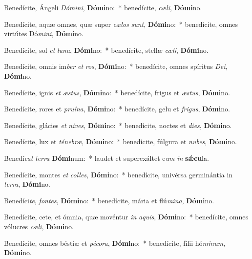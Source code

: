 \item Benedícite, Ángeli \textit{Dó}\textit{mi}\textit{ni}, \textbf{Dó}\textbf{mi}no:~* benedícite, \textit{cæ}\textit{li}, \textbf{Dó}\textbf{mi}no.
\item Benedícite, aquæ omnes, quæ super \textit{cæ}\textit{los} \textit{sunt}, \textbf{Dó}\textbf{mi}no:~* benedícite, omnes virtútes Dó\textit{mi}\textit{ni}, \textbf{Dó}\textbf{mi}no.
\item Benedícite, sol \textit{et} \textit{lu}\textit{na}, \textbf{Dó}\textbf{mi}no:~* benedícite, stellæ \textit{cæ}\textit{li}, \textbf{Dó}\textbf{mi}no.
\item Benedícite, omnis im\textit{ber} \textit{et} \textit{ros}, \textbf{Dó}\textbf{mi}no:~* benedícite, omnes spíritus \textit{De}\textit{i}, \textbf{Dó}\textbf{mi}no.
\item Benedícite, ignis \textit{et} \textit{æs}\textit{tus}, \textbf{Dó}\textbf{mi}no:~* benedícite, frigus et \textit{æs}\textit{tus}, \textbf{Dó}\textbf{mi}no.
\item Benedícite, rores et \textit{pru}\textit{í}\textit{na}, \textbf{Dó}\textbf{mi}no:~* benedícite, gelu et \textit{fri}\textit{gus}, \textbf{Dó}\textbf{mi}no.
\item Benedícite, glácies \textit{et} \textit{ni}\textit{ves}, \textbf{Dó}\textbf{mi}no:~* benedícite, noctes et \textit{di}\textit{es}, \textbf{Dó}\textbf{mi}no.
\item Benedícite, lux et \textit{té}\textit{ne}\textit{bræ}, \textbf{Dó}\textbf{mi}no:~* benedícite, fúlgura et \textit{nu}\textit{bes}, \textbf{Dó}\textbf{mi}no.
\item Benedí\textit{cat} \textit{ter}\textit{ra} \textbf{Dó}\textbf{mi}num:~* laudet et superexáltet e\textit{um} \textit{in} \textbf{sǽ}\textbf{cu}la.
\item Benedícite, montes \textit{et} \textit{col}\textit{les}, \textbf{Dó}\textbf{mi}no:~* benedícite, univérsa germinántia in \textit{ter}\textit{ra}, \textbf{Dó}\textbf{mi}no.
\item Benedíci\textit{te}, \textit{fon}\textit{tes}, \textbf{Dó}\textbf{mi}no:~* benedícite, mária et flú\textit{mi}\textit{na}, \textbf{Dó}\textbf{mi}no.
\item Benedícite, cete, et ómnia, quæ movéntur \textit{in} \textit{a}\textit{quis}, \textbf{Dó}\textbf{mi}no:~* benedícite, omnes vólucres \textit{cæ}\textit{li}, \textbf{Dó}\textbf{mi}no.
\item Benedícite, omnes béstiæ et \textit{pé}\textit{co}\textit{ra}, \textbf{Dó}\textbf{mi}no:~* benedícite, fílii hó\textit{mi}\textit{num}, \textbf{Dó}\textbf{mi}no.
